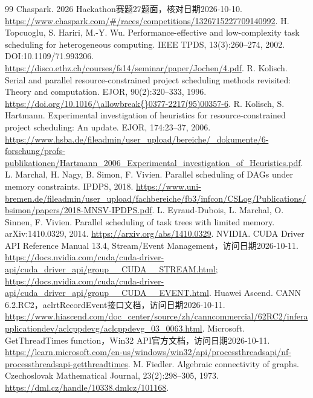 \documentclass[UTF8,a4paper,11pt,fontset=fandol]{ctexart}
\begin{document}
\begin{thebibliography}{99}
 Chaspark. 2026 Hackathon赛题27题面，核对日期2026-10-10.
\url{https://www.chaspark.com/#/races/competitions/1326715227709140992}.
 H. Topcuoglu, S. Hariri, M.-Y. Wu. Performance-effective and low-complexity task scheduling for heterogeneous computing.
IEEE TPDS, 13(3):260--274, 2002. DOI:10.1109/\allowbreak{}71.993206.
\url{https://disco.ethz.ch/courses/fs14/seminar/paper/Jochen/4.pdf}.
 R. Kolisch. Serial and parallel resource-constrained project scheduling methods revisited: Theory and computation.
EJOR, 90(2):320--333, 1996. \url{https://doi.org/10.1016/\allowbreak{}0377-2217(95)00357-6}.
 R. Kolisch, S. Hartmann. Experimental investigation of heuristics for resource-constrained project scheduling: An update.
EJOR, 174:23--37, 2006.
\url{https://www.hsba.de/fileadmin/user_upload/bereiche/_dokumente/6-forschung/profs-publikationen/Hartmann_2006_Experimental_investigation_of_Heuristics.pdf}.
 L. Marchal, H. Nagy, B. Simon, F. Vivien. Parallel scheduling of DAGs under memory constraints.
IPDPS, 2018.
\url{https://www.uni-bremen.de/fileadmin/user_upload/fachbereiche/fb3/infcon/CSLog/Publications/bsimon/papers/2018-MNSV-IPDPS.pdf}.
 L. Eyraud-Dubois, L. Marchal, O. Sinnen, F. Vivien. Parallel scheduling of task trees with limited memory.
arXiv:1410.0329, 2014. \url{https://arxiv.org/abs/1410.0329}.
 NVIDIA. CUDA Driver API Reference Manual 13.4, Stream/Event Management，访问日期2026-10-11.
\url{https://docs.nvidia.com/cuda/cuda-driver-api/cuda_driver_api/group__CUDA__STREAM.html};
\url{https://docs.nvidia.com/cuda/cuda-driver-api/cuda_driver_api/group__CUDA__EVENT.html}.
 Huawei Ascend. CANN 6.2.RC2，aclrtRecordEvent接口文档，访问日期2026-10-11.
\url{https://www.hiascend.com/doc_center/source/zh/canncommercial/62RC2/inferapplicationdev/aclcppdevg/aclcppdevg_03_0063.html}.
 Microsoft. GetThreadTimes function，Win32 API官方文档，访问日期2026-10-11.
\url{https://learn.microsoft.com/en-us/windows/win32/api/processthreadsapi/nf-processthreadsapi-getthreadtimes}.
 M. Fiedler. Algebraic connectivity of graphs. Czechoslovak Mathematical Journal, 23(2):298--305, 1973.
\url{https://dml.cz/handle/10338.dmlcz/101168}.
\end{thebibliography}
\end{document}
